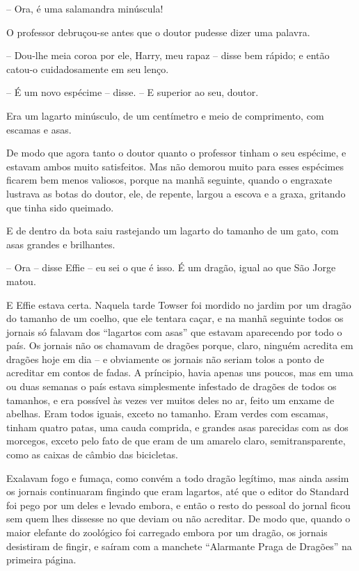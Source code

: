 -- Ora, é uma salamandra minúscula!

O professor debruçou-se antes que o doutor pudesse dizer uma palavra.

-- Dou-lhe meia coroa por ele, Harry, meu rapaz -- disse bem rápido; e
então catou-o cuidadosamente em seu lenço.

-- É um novo espécime -- disse. -- E superior ao seu, doutor.

Era um lagarto minúsculo, de um centímetro e meio de comprimento, com
escamas e asas.

De modo que agora tanto o doutor quanto o professor tinham o seu
espécime, e estavam ambos muito satisfeitos. Mas não demorou muito
para esses espécimes ficarem bem menos valiosos, porque na manhã
seguinte, quando o engraxate lustrava as botas do doutor, ele, de
repente, largou a escova e a graxa, gritando que tinha sido queimado.

E de dentro da bota saiu rastejando um lagarto do tamanho de um gato,
com asas grandes e brilhantes.

-- Ora -- disse Effie -- eu sei o que é isso. É um dragão, igual ao que
São Jorge matou.

E Effie estava certa. Naquela tarde Towser foi mordido no jardim por
um dragão do tamanho de um coelho, que ele tentara caçar, e na manhã
seguinte todos os jornais só falavam dos “lagartos com asas” que
estavam aparecendo por todo o país. Os jornais não os chamavam de
dragões porque, claro, ninguém acredita em dragões hoje em dia -- e
obviamente os jornais não seriam tolos a ponto de acreditar em contos
de fadas. A príncipio, havia apenas uns poucos, mas em uma ou duas
semanas o país estava simplesmente infestado de dragões de todos os
tamanhos, e era possível às vezes ver muitos deles no ar, feito um
enxame de abelhas. Eram todos iguais, exceto no tamanho. Eram verdes
com escamas, tinham quatro patas, uma cauda comprida, e grandes asas
parecidas com as dos morcegos, exceto pelo fato de que eram de um
amarelo claro, semitransparente, como as caixas de câmbio das
bicicletas.

Exalavam fogo e fumaça, como convém a todo dragão legítimo, mas ainda
assim os jornais continuaram fingindo que eram lagartos, até que o
editor do Standard foi pego por um deles e levado embora, e então o
resto do pessoal do jornal ficou sem quem lhes dissesse no que deviam
ou não acreditar. De modo que, quando o maior elefante do zoológico
foi carregado embora por um dragão, os jornais desistiram de fingir,
e saíram com a manchete “Alarmante Praga de Dragões” na primeira
página.

